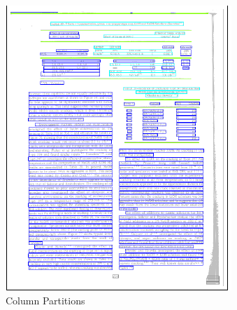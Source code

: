 \begin{figure}[H]
\begin{subfigure}{0.31\textwidth}
\includegraphics[width=\linewidth]{img/tableDetectionPartitions.pdf}
\caption{Column Partitions} \label{fig:1b}
\end{subfigure}
\hspace*{\fill} %
\begin{subfigure}{0.31\textwidth}

\end{subfigure}
\end{figure}
